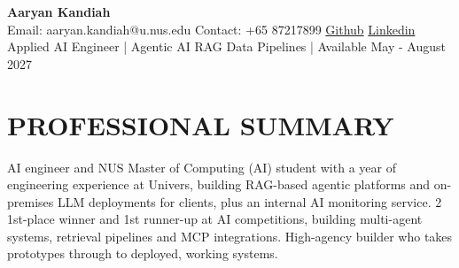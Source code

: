 \documentclass[10pt, letterpaper]{article}
\begin{document}
\begin{center}
  {\bfseries \fontsize{14pt}{16pt}\selectfont Aaryan Kandiah} \\
  \vspace{0pt}
  Email: aaryan.kandiah@u.nus.edu \textbar{} Contact: +65 87217899 \textbar{} \href{https://github.com/Aaryan126}{Github} \textbar{} \href{https://www.linkedin.com/in/aaryan-kandiah/}{Linkedin} \\
  \vspace{0pt}
  Applied AI Engineer | Agentic AI \textperiodcentered{} RAG \textperiodcentered{} Data Pipelines | Available May - August 2027
\end{center}
\vspace{0pt}

\section*{PROFESSIONAL SUMMARY}
\vspace{2pt}
AI engineer and NUS Master of Computing (AI) student with a year of engineering experience at Univers, building RAG-based agentic platforms and on-premises LLM deployments for clients, plus an internal AI monitoring service. 2\texttimes{} 1st-place winner and 1st runner-up at AI competitions, building multi-agent systems, retrieval pipelines and MCP integrations. High-agency builder who takes prototypes through to deployed, working systems.

\vspace{2pt}

\end{document}
